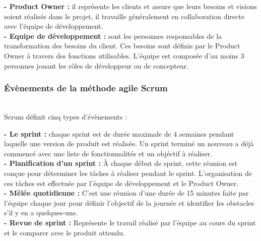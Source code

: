 \noindent \textbf{\LARGE - Product Owner : }\textsf{\selectfont{} il représente les clients et assure que leurs besoins et visions soient réalisés dans le projet, il travaille généralement en collaboration directe avec l’équipe de développement. }\\[0.1cm]

\noindent \textbf{\LARGE - Equipe de développement : }\textsf{\selectfont{}sont les personnes responsables de la transformation des besoins du client. Ces besoins sont définis par le Product Owner à travers des fonctions utilisables. L'équipe est composée d'au moins 3 personnes jouant les rôles de développeur ou de concepteur.}\\[0.1cm]
\subsubsection{\Large Évènements de la méthode agile Scrum }
\texttt{}\\[0.1cm]
\textsf{\selectfont{} Scrum définit cinq types d'évènements :}\\[0.1cm]
\par \noindent \textbf{\LARGE - Le sprint :}\textsf{\selectfont{} chaque sprint est de durée maximale de 4 semaines pendant laquelle une version de produit est réalisée. Un sprint terminé un nouveau a déjà commencé avec une liste de fonctionnalités et un objéctif à réaliser.} \\[0.1cm]

\noindent \textbf{\LARGE - Planification d’un sprint : }\textsf{\selectfont{} À chaque début de sprint, cette réunion est conçue pour déterminer les tâches à réaliser pendant le sprint. L’organisation de ces tâches est effectuée par l’équipe de développement et le Product Owner. }\\[0.1cm]

\noindent \textbf{\LARGE - Mêlée quotidienne : }\textsf{\selectfont{} C'est une réunion d'une durée de 15 minutes faite par l’équipe chaque jour pour définir l’objectif de la journée et identifier les obstacles s’il y en a quelques-uns.}\\[0.1cm]

\noindent \textbf{\LARGE - Revue de sprint : } \textsf{\selectfont{} Représente le travail réalisé par l’équipe au cours du sprint et le comparer avec le produit attendu.}\\[0.1cm]

